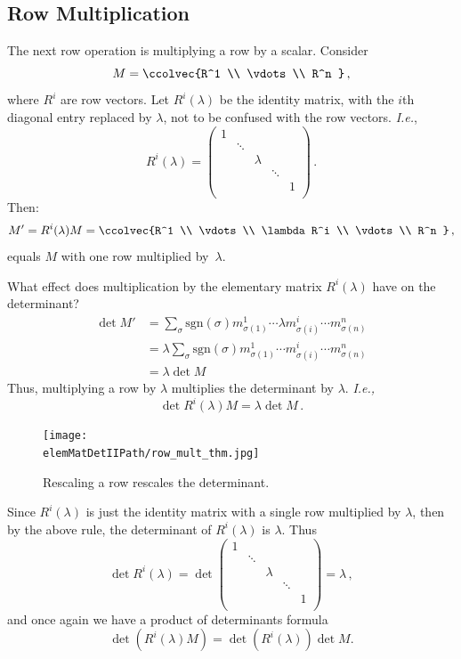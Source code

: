 \subsection{Row  Multiplication}
The next row operation is multiplying a row by a scalar.
Consider \[M=\ccolvec{R^1 \\ \vdots \\ R^n }\, ,\] where $R^i$ are row vectors.  Let $R^i(\lambda)$ be the identity matrix, with the $i$th diagonal entry replaced by $\lambda$, not to be confused with the row vectors. {\itshape I.e.},
\[
R^i(\lambda)=
\begin{pmatrix}
1 & & & & \\
  & \ddots & & & \\
  & & \lambda & & \\
  & & & \ddots & \\
  & & & & 1 \\
\end{pmatrix}
\, .\]
Then:
\[
M'=R^i(\lambda)M=\ccolvec{R^1 \\ \vdots \\ \lambda R^i \\ \vdots \\ R^n }\, ,
\]
equals $M$ with one row multiplied by~$\lambda$.

What effect does multiplication by the elementary matrix $R^i(\lambda)$ have on the determinant?
\begin{align*}
\det M' & = \sum_{\sigma} \text{sgn}(\sigma) m^1_{\sigma(1)}\cdots \lambda m^i_{\sigma(i)} \cdots m^n_{\sigma(n)} \\
& = \lambda \sum_{\sigma} \text{sgn}(\sigma) m^1_{\sigma(1)}\cdots m^i_{\sigma(i)} \cdots m^n_{\sigma(n)} \\
& = \lambda \det M
\end{align*}
Thus, multiplying a row by $\lambda$ multiplies the determinant by $\lambda$.
{\itshape I.e.,} \[\det R^i(\lambda) M = \lambda \det M\, .\]


\begin{figure}
\begin{center}
\texttt{[image: \\elemMatDetIIPath/row\_mult\_thm.jpg]}
\end{center}
\caption{Rescaling a row rescales the determinant.}
\end{figure}


Since $R^i(\lambda)$ is just the identity matrix with a single row multiplied by $\lambda$, then by the above rule, the determinant of $R^i(\lambda)$ is $\lambda$.  Thus
\[
\det R^i(\lambda) = \det \begin{pmatrix}
1 & & & & \\
  & \ddots & & & \\
  & & \lambda & & \\
  & & & \ddots & \\
  & & & & 1 \\
\end{pmatrix} = \lambda\, ,
\]
and once again we have a product of determinants formula
\[
\det \left( R^i(\lambda) M \right) = \det\left( R^i(\lambda) \right)\det M.
\]


